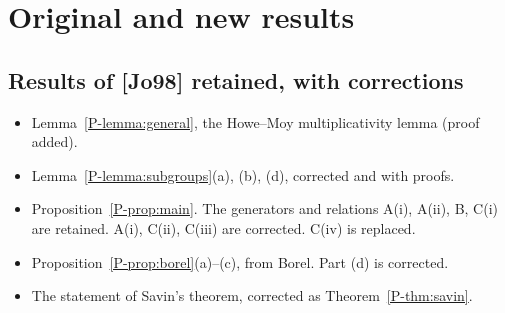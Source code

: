\documentclass[12pt,letterpaper]{amsart}
\begin{document}
\section{Original and new results}

\subsection*{Results of [Jo98] retained, with corrections}
\begin{itemize}[leftmargin=1.5em]
\item Lemma~\ref{P-lemma:general}, the Howe--Moy multiplicativity
lemma (proof added).
\item Lemma~\ref{P-lemma:subgroups}(a), (b), (d), corrected and with
proofs.
\item Proposition~\ref{P-prop:main}. The generators and relations
A(i), A(ii), B, C(i) are retained. A(i), C(ii), C(iii) are corrected.
C(iv) is replaced.
\item Proposition~\ref{P-prop:borel}(a)--(c), from Borel. Part (d) is
corrected.
\item The statement of Savin's theorem, corrected as
Theorem~\ref{P-thm:savin}.
\end{itemize}
\end{document}

